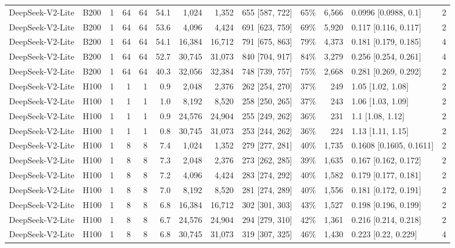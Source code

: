 \begin{landscape}
\begin{longtable}{llrrrrrrlrrlr}
DeepSeek-V2-Lite & B200 & 1 & 64 & 64 & 54.1 & 1,024 & 1,352 & 655 {[}587, 722{]} & 65\% & 6,566 & 0.0996 {[}0.0988, 0.1{]} & 2 \\
DeepSeek-V2-Lite & B200 & 1 & 64 & 64 & 53.6 & 4,096 & 4,424 & 691 {[}623, 759{]} & 69\% & 5,920 & 0.117 {[}0.116, 0.117{]} & 2 \\
DeepSeek-V2-Lite & B200 & 1 & 64 & 64 & 54.1 & 16,384 & 16,712 & 791 {[}675, 863{]} & 79\% & 4,373 & 0.181 {[}0.179, 0.185{]} & 4 \\
DeepSeek-V2-Lite & B200 & 1 & 64 & 64 & 52.7 & 30,745 & 31,073 & 840 {[}704, 917{]} & 84\% & 3,279 & 0.256 {[}0.254, 0.261{]} & 4 \\
DeepSeek-V2-Lite & B200 & 1 & 64 & 64 & 40.3 & 32,056 & 32,384 & 748 {[}739, 757{]} & 75\% & 2,668 & 0.281 {[}0.269, 0.292{]} & 2 \\
DeepSeek-V2-Lite & H100 & 1 & 1 & 1 & 0.9 & 2,048 & 2,376 & 262 {[}254, 270{]} & 37\% & 249 & 1.05 {[}1.02, 1.08{]} & 2 \\
DeepSeek-V2-Lite & H100 & 1 & 1 & 1 & 1.0 & 8,192 & 8,520 & 258 {[}250, 265{]} & 37\% & 243 & 1.06 {[}1.03, 1.09{]} & 2 \\
DeepSeek-V2-Lite & H100 & 1 & 1 & 1 & 0.9 & 24,576 & 24,904 & 255 {[}249, 262{]} & 36\% & 231 & 1.1 {[}1.08, 1.12{]} & 2 \\
DeepSeek-V2-Lite & H100 & 1 & 1 & 1 & 0.8 & 30,745 & 31,073 & 253 {[}244, 262{]} & 36\% & 224 & 1.13 {[}1.11, 1.15{]} & 2 \\
DeepSeek-V2-Lite & H100 & 1 & 8 & 8 & 7.4 & 1,024 & 1,352 & 279 {[}277, 281{]} & 40\% & 1,735 & 0.1608 {[}0.1605, 0.1611{]} & 2 \\
DeepSeek-V2-Lite & H100 & 1 & 8 & 8 & 7.3 & 2,048 & 2,376 & 273 {[}262, 285{]} & 39\% & 1,635 & 0.167 {[}0.162, 0.172{]} & 2 \\
DeepSeek-V2-Lite & H100 & 1 & 8 & 8 & 7.2 & 4,096 & 4,424 & 283 {[}274, 292{]} & 40\% & 1,582 & 0.179 {[}0.177, 0.181{]} & 2 \\
DeepSeek-V2-Lite & H100 & 1 & 8 & 8 & 7.0 & 8,192 & 8,520 & 281 {[}274, 289{]} & 40\% & 1,556 & 0.181 {[}0.172, 0.191{]} & 2 \\
DeepSeek-V2-Lite & H100 & 1 & 8 & 8 & 6.8 & 16,384 & 16,712 & 302 {[}301, 303{]} & 43\% & 1,527 & 0.198 {[}0.196, 0.199{]} & 2 \\
DeepSeek-V2-Lite & H100 & 1 & 8 & 8 & 6.7 & 24,576 & 24,904 & 294 {[}279, 310{]} & 42\% & 1,361 & 0.216 {[}0.214, 0.218{]} & 2 \\
DeepSeek-V2-Lite & H100 & 1 & 8 & 8 & 6.8 & 30,745 & 31,073 & 319 {[}307, 325{]} & 46\% & 1,430 & 0.223 {[}0.22, 0.229{]} & 4 \\

\end{longtable}
\end{landscape}
